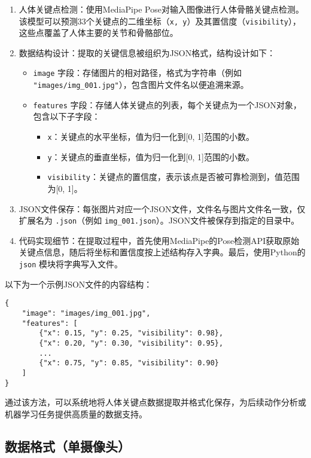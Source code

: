 \begin{enumerate}
    \item 人体关键点检测：使用MediaPipe Pose对输入图像进行人体骨骼关键点检测。该模型可以预测33个关键点的二维坐标（\texttt{x, y}）及其置信度（\texttt{visibility}），这些点覆盖了人体主要的关节和骨骼部位。
    \item 数据结构设计：提取的关键信息被组织为JSON格式，结构设计如下：
    \begin{itemize}
        \item \texttt{image} 字段：存储图片的相对路径，格式为字符串（例如 \texttt{"images/img\_001.jpg"}），包含图片文件名以便追溯来源。
        \item \texttt{features} 字段：存储人体关键点的列表，每个关键点为一个JSON对象，包含以下子字段：
        \begin{itemize}
            \item \texttt{x}：关键点的水平坐标，值为归一化到[0, 1]范围的小数。
            \item \texttt{y}：关键点的垂直坐标，值为归一化到[0, 1]范围的小数。
            \item \texttt{visibility}：关键点的置信度，表示该点是否被可靠检测到，值范围为[0, 1]。
        \end{itemize}
    \end{itemize}
    \item JSON文件保存：每张图片对应一个JSON文件，文件名与图片文件名一致，仅扩展名为 \texttt{.json}（例如 \texttt{img\_001.json}）。JSON文件被保存到指定的目录中。
    \item 代码实现细节：在提取过程中，首先使用MediaPipe的Pose检测API获取原始关键点信息，随后将坐标和置信度按上述结构存入字典。最后，使用Python的 \texttt{json} 模块将字典写入文件。
\end{enumerate}

以下为一个示例JSON文件的内容结构：
\begin{verbatim}
{
    "image": "images/img_001.jpg",
    "features": [
        {"x": 0.15, "y": 0.25, "visibility": 0.98},
        {"x": 0.20, "y": 0.30, "visibility": 0.95},
        ...
        {"x": 0.75, "y": 0.85, "visibility": 0.90}
    ]
}
\end{verbatim}

通过该方法，可以系统地将人体关键点数据提取并格式化保存，为后续动作分析或机器学习任务提供高质量的数据支持。

\subsection{数据格式（单摄像头）}


